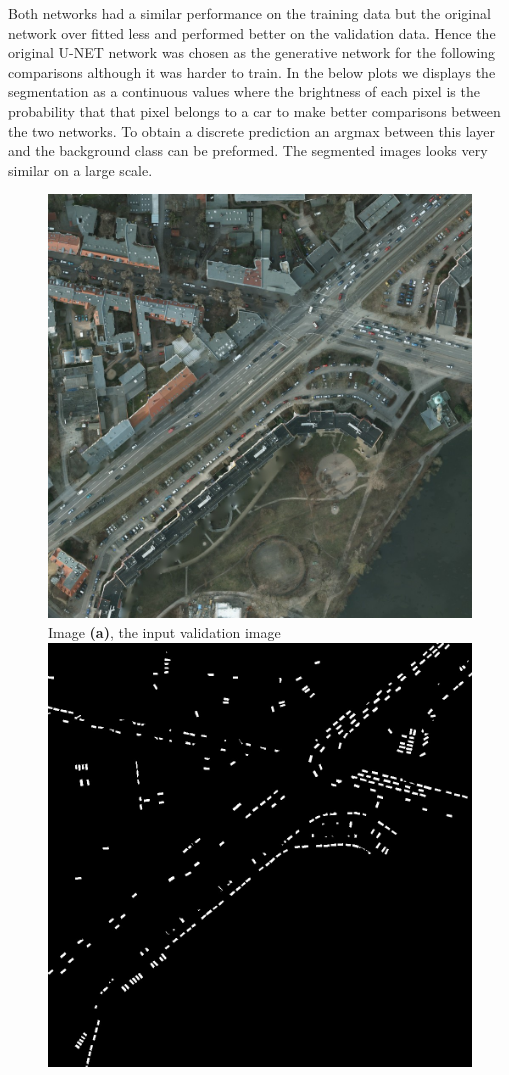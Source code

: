 \documentclass[a4paper,11pt]{article}
\begin{document}
Both networks had a similar performance on the training data but the original network over fitted less and performed better on the validation data. Hence the original U-NET network was chosen as the generative network for the following comparisons although it was harder to train.
In the below plots we displays the segmentation as a continuous values where the brightness of each pixel is the probability that that pixel belongs to a car to make better comparisons between the two networks. To obtain a discrete prediction an argmax between this layer and the background class can be preformed. The segmented images looks very similar on a large scale.
\begin{figure}[H]
  \includegraphics[width=\linewidth]{gan_vs_class/img_4}
  Image \textbf{(a)}, the input validation image
\endminipage\hfill
{}
  \includegraphics[width=\linewidth]{gan_vs_class/label_4}

\end{figure}
\end{document}
